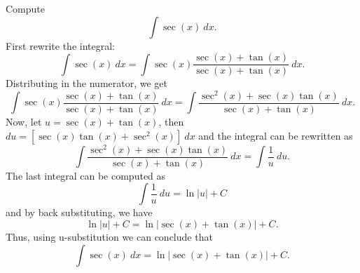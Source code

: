 \documentclass{ximera}
\begin{document}
\begin{example}[example 16] Compute 
\[\int \sec(x) \ dx.\]
First rewrite the integral:
\[\int \sec(x) \ dx =\int \sec(x)\frac{\sec(x)+\tan(x)}{\sec(x)+\tan(x)} \ dx.\]
Distributing in the numerator, we get
\[\int \sec(x)\frac{\sec(x)+\tan(x)}{\sec(x)+\tan(x)} \ dx = \int \frac{\sec^2(x)+\sec(x)\tan(x)}{\sec(x)+\tan(x)} \ dx.\]
Now, let $u = \sec(x) + \tan(x)$, then $du = [\sec(x)\tan(x) + \sec^2(x)] \ dx$ and the integral can be rewritten as
\[ \int \frac{\sec^2(x)+\sec(x)\tan(x)}{\sec(x)+\tan(x)} \ dx = \int \frac{1}{u} \ du.\]
The last integral can be computed as
\[\int \frac{1}{u} \ du = \ln|u| + C\]
and by back substituting, we have 
\[\ln|u| + C = \ln|\sec(x) + \tan(x)| + C.\]
Thus, using u-substitution we can conclude that
\[\int \sec(x) \ dx =  \ln|\sec(x) + \tan(x)| + C.\]
\end{example}


\begin{center}
\begin{foldable}
\end{foldable}
\end{center}
\end{document}

